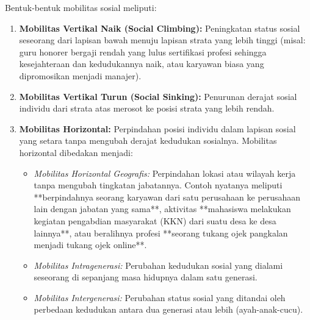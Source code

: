 \documentclass[12pt, a4paper]{article}
\begin{document}
Bentuk-bentuk mobilitas sosial meliputi:
\begin{enumerate}
    \item \textbf{Mobilitas Vertikal Naik (Social Climbing):} Peningkatan status sosial seseorang dari lapisan bawah menuju lapisan strata yang lebih tinggi (misal: guru honorer bergaji rendah yang lulus sertifikasi profesi sehingga kesejahteraan dan kedudukannya naik, atau karyawan biasa yang dipromosikan menjadi manajer).
    \item \textbf{Mobilitas Vertikal Turun (Social Sinking):} Penurunan derajat sosial individu dari strata atas merosot ke posisi strata yang lebih rendah.
    \item \textbf{Mobilitas Horizontal:} Perpindahan posisi individu dalam lapisan sosial yang setara tanpa mengubah derajat kedudukan sosialnya. Mobilitas horizontal dibedakan menjadi:
    \begin{itemize}
        \item \textit{Mobilitas Horizontal Geografis:} Perpindahan lokasi atau wilayah kerja tanpa mengubah tingkatan jabatannya. Contoh nyatanya meliputi **berpindahnya seorang karyawan dari satu perusahaan ke perusahaan lain dengan jabatan yang sama**, aktivitas **mahasiswa melakukan kegiatan pengabdian masyarakat (KKN) dari suatu desa ke desa lainnya**, atau beralihnya profesi **seorang tukang ojek pangkalan menjadi tukang ojek online**.
        \item \textit{Mobilitas Intragenerasi:} Perubahan kedudukan sosial yang dialami seseorang di sepanjang masa hidupnya dalam satu generasi.
        \item \textit{Mobilitas Intergenerasi:} Perubahan status sosial yang ditandai oleh perbedaan kedudukan antara dua generasi atau lebih (ayah-anak-cucu).
    \end{itemize}
\end{enumerate}
\end{document}
